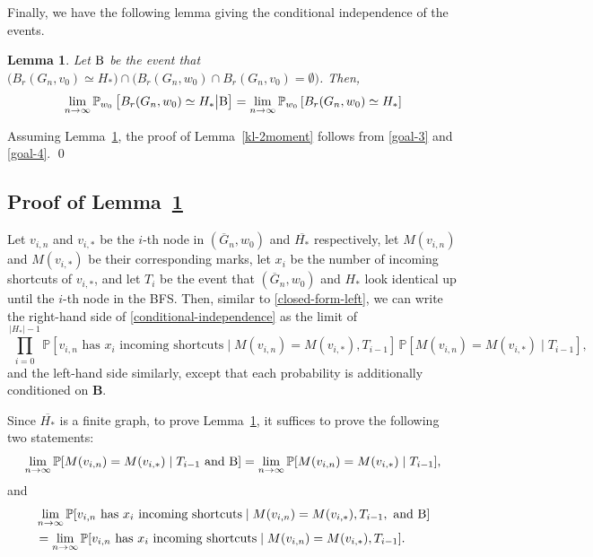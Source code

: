 \documentclass[10pt]{amsart}
\newtheorem{lemma}[theorem]{Lemma}
\begin{document}
Finally, we have the following lemma giving the conditional independence of the events.
\begin{lemma} \label{conditional-independence-lemma}
    Let $\text{\textbf{B}}$ be the event that $\big(B_r(G_n,v_0) \simeq H_*\big)  \cap\big( B_r(G_n,w_0) \cap B_{r}(G_n,v_0) = \emptyset \big)$. Then, 
    \begin{equation} \label{conditional-independence}
        \lim_{n \to \infty} \mathbb{P}_{w_0}\left[B_r(G_n,w_0) \simeq H_* \big| \text{\textbf{B}} \right] = \lim_{n \to \infty} \mathbb{P}_{w_0}\left[B_r(G_n,w_0) \simeq H_* \right]
    \end{equation}
\end{lemma}

Assuming Lemma~\ref{conditional-independence-lemma}, the proof of Lemma~\ref{kl-2moment} follows from \eqref{goal-3} and \eqref{goal-4}. \qed


\subsection*{Proof of Lemma~\ref{conditional-independence-lemma}}

Let $v_{i,n}$ and $v_{i,*}$ be the $i$-th node in $(\overline{G}_n, w_0)$ and $\overline{H_*}$ respectively, let $M(v_{i,n})$ and $M(v_{i,*})$ be their corresponding marks, let $x_i$ be the number of incoming shortcuts of $v_{i,*}$, and let $T_i$ be the event that $(\overline{G}_n, w_0)$ and $H_*$ look identical up until the $i$-th node in the BFS. Then, similar to \eqref{closed-form-left}, we can write the right-hand side of \eqref{conditional-independence} as the limit of
\begin{equation*} 
     \prod_{i =0}^{|H_*|-1} \mathbb{P}[\text{$v_{i,n}$ has $x_i$ incoming shortcuts} \mid M(v_{i,n}) = M(v_{i,*}), T_{i-1}] \, \mathbb{P}[M(v_{i,n}) = M(v_{i,*}) \mid T_{i-1}],
\end{equation*}
and the left-hand side similarly, except that each probability is additionally conditioned on \textbf{B}.

Since $\overline{H_*}$ is a finite graph, to prove Lemma~\ref{conditional-independence-lemma}, it suffices to prove the following two statements:
\begin{equation} \label{statement-3}
    \lim_{n \to \infty} 
 \mathbb{P}[M(v_{i,n}) = M(v_{i,*}) \mid T_{i-1} \text{ and \textbf{B}}] = \lim_{n \to \infty}  \mathbb{P}[M(v_{i,n}) = M(v_{i,*}) \mid T_{i-1}],
\end{equation}
and
\begin{equation} \label{statement-4}
\begin{split}
    & \lim_{n \to \infty}  \mathbb{P}[\text{$v_{i,n}$ has $x_i$ incoming shortcuts} \mid M(v_{i,n}) = M(v_{i,*}), T_{i-1}, \text{ and \textbf{B}}]\\
    &= \lim_{n \to \infty} \mathbb{P}[\text{$v_{i,n}$ has $x_i$ incoming shortcuts} \mid M(v_{i,n}) = M(v_{i,*}), T_{i-1}].
\end{split}
\end{equation}
\end{document}
